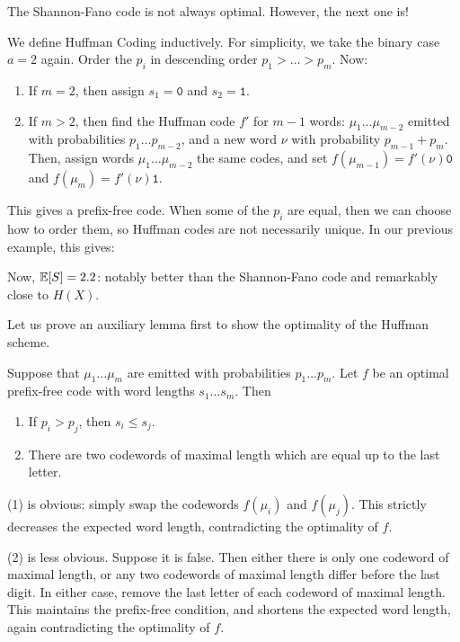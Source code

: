 \documentclass{article}
\begin{document}
\begin{note}
	The Shannon-Fano code is not always optimal.
	However, the next one is!
\end{note}

\begin{example}
    We define Huffman Coding inductively.
    For simplicity, we take the binary case $a = 2$ again.
    Order the $p_i$ in descending order $p_1 > \dots > p_m$. Now:
    
    \begin{enumerate}
    	\item If $m=2$, then assign $s_1 = \texttt{0}$ and $s_2 = \texttt{1}$.
    	\item If $m>2$, then find the Huffman code $f'$ for $m-1$ words: $\mu_1 \dots \mu_{m-2}$ emitted with probabilities $p_1 \dots p_{m-2}$, and a new word $\nu$ with probability $p_{m-1} + p_m$. Then, assign words $\mu_1 \dots \mu_{m-2}$ the same codes, and set $f(\mu_{m-1}) = f'(\nu)\texttt{0}$ and $f(\mu_{m}) = f'(\nu)\texttt{1}$.
	\end{enumerate}
	
	This gives a prefix-free code.
	When some of the $p_i$ are equal,
	then we can choose how to order them,
	so Huffman codes are not necessarily unique.
	In our previous example, this gives:
	
	
	Now, $\mathbb{E}[S] = 2.2$:
	notably better than the Shannon-Fano code
	and remarkably close to $H(X)$.
\end{example}

Let us prove an auxiliary lemma first to show the optimality of the Huffman scheme.

\begin{proposition}
	\label{sorting-and-almost-equality}
    Suppose that $\mu_1 \dots \mu_m$
    are emitted with probabilities $p_1 \dots p_m$.
    Let $f$ be an optimal prefix-free code
    with word lengths $s_1 \dots s_m$. Then
    
    \begin{enumerate}
	    \item If $p_i > p_j$, then $s_i \leq s_j$.
	    \item There are two codewords of maximal length which are equal up to the last letter.
	\end{enumerate}
\end{proposition}

\begin{prf}
    (1) is obvious:
    simply swap the codewords $f(\mu_i)$ and $f(\mu_j)$.
    This strictly decreases the expected word length,
    contradicting the optimality of $f$.
    
    (2) is less obvious. Suppose it is false.
    Then either there is only one codeword of maximal length,
    or any two codewords of maximal length differ before the last digit.
    In either case, remove the last letter of each codeword of maximal length.
    This maintains the prefix-free condition,
    and shortens the expected word length,
    again contradicting the optimality of $f$.
\end{prf}
\end{document}
